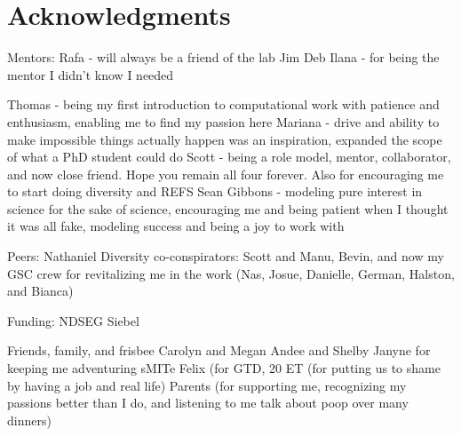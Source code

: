 \cleardoublepage
\setcounter{savepage}{\thepage}
\begin{abstractpage}

\end{abstractpage}

\cleardoublepage

\section*{Acknowledgments}

Mentors:
Rafa - will always be a friend of the lab
Jim
Deb
Ilana - for being the mentor I didn't know I needed

Thomas - being my first introduction to computational work with patience and enthusiasm, enabling me to find my passion here
Mariana - drive and ability to make impossible things actually happen was an inspiration, expanded the scope of what a PhD student could do
Scott - being a role model, mentor, collaborator, and now close friend. Hope you remain all four forever. Also for encouraging me to start doing diversity and REFS
Sean Gibbons - modeling pure interest in science for the sake of science, encouraging me and being patient when I thought it was all fake, modeling success and being a joy to work with

Peers:
Nathaniel
Diversity co-conspirators: Scott and Manu, Bevin, and now my GSC crew for revitalizing me in the work (Nas, Josue, Danielle, German, Halston, and Bianca)

Funding:
NDSEG
Siebel

Friends, family, and frisbee
Carolyn and Megan
Andee and Shelby
Janyne for keeping me adventuring
sMITe
Felix (for GTD, 20%
ET (for putting us to shame by having a job and real life)
Parents (for supporting me, recognizing my passions better than I do, and listening to me talk about poop over many dinners)
